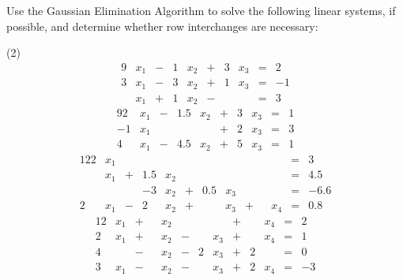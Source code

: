 \documentclass[../../../../Assignments]{subfiles}
\begin{document}
\begin{exercise}
    Use the Gaussian Elimination Algorithm to solve the following linear
    systems, if possible, and determine whether row interchanges are necessary:

    \begin{tasks}(2)
        \task
            \begin{alignat*}{9}
                 &x_1 &{}-{}& 1&x_2 &{}+{}& 3&x_3 &{}={}&  2 \\
                3&x_1 &{}-{}& 3&x_2 &{}+{}& 1&x_3 &{}={}& -1 \\
                 &x_1 &{}+{}& 1&x_2 &{}-{}&  &    &{}={}&  3
            \end{alignat*}
        \task
            \begin{alignat*}{9}
                 2&x_1 &{}-{}& \num{1.5}&x_2 &{}+{}& 3&x_3 &{}={}&  1 \\
                -1&x_1 &{} {}&          &    &{}+{}& 2&x_3 &{}={}&  3 \\
                 4&x_1 &{}-{}& \num{4.5}&x_2 &{}+{}& 5&x_3 &{}={}&  1
            \end{alignat*}
        \task
            \begin{alignat*}{12}
                2&x_1 &{} {}&          &    &{} {}&          &    &{} {}&  &    &{}={}&       3     \\
                 &x_1 &{}+{}& \num{1.5}&x_2 &{} {}&          &    &{} {}&  &    &{}={}&  \num{4.5}  \\
                 &    &{} {}&  \num{-3}&x_2 &{}+{}& \num{0.5}&x_3 &{} {}&  &    &{}={}& \num{-6.6}  \\
                2&x_1 &{}-{}&         2&x_2 &{}+{}&          &x_3 &{}+{}&  &x_4 &{}={}&  \num{0.8}
            \end{alignat*}
        \task
            \begin{alignat*}{12}
                 &x_1 &{}+{}&  &x_2 &{} {}&  &    &{}+{}&  &x_4 &{}={}&  2 \\
                2&x_1 &{}+{}&  &x_2 &{}-{}&  &x_3 &{}+{}&  &x_4 &{}={}&  1 \\
                4&    &{}-{}&  &x_2 &{}-{}& 2&x_3 &{}+{}& 2&    &{}={}&  0 \\
                3&x_1 &{}-{}&  &x_2 &{}-{}&  &x_3 &{}+{}& 2&x_4 &{}={}& -3
            \end{alignat*}
    \end{tasks}
\end{exercise}
\end{document}

